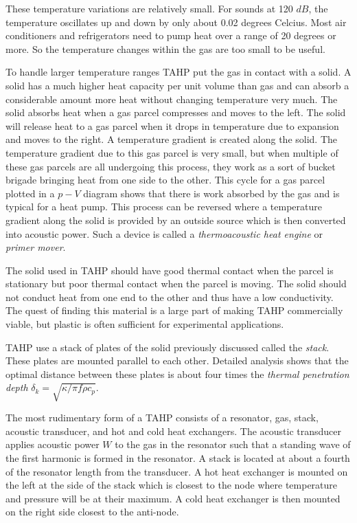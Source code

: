 \documentclass{article}
\begin{document}
These temperature variations are relatively small. For sounds at 120 \(dB\), the temperature oscillates up and down by only about 0.02 degrees Celcius. Most air conditioners and refrigerators need to pump heat over a range of 20 degrees or more. So the temperature changes within the gas are too small to be useful.

To handle larger temperature ranges TAHP put the gas in contact with a solid. A solid has a much higher heat capacity per unit volume than gas and can absorb a considerable amount more heat without changing temperature very much. The solid absorbs heat when a gas parcel compresses and moves to the left. The solid will release heat to a gas parcel when it drops in temperature due to expansion and moves to the right. A temperature gradient is created along the solid. The temperature gradient due to this gas parcel is very small, but when multiple of these gas parcels are all undergoing this process, they work as a sort of bucket brigade bringing heat from one side to the other. %
This cycle for a gas parcel plotted in a \(p-V\) diagram shows that there is work absorbed by the gas and is typical for a heat pump.  %
This process can be reversed where a temperature gradient along the solid is provided by an outside source which is then converted into acoustic power. Such a device is called a \emph{thermoacoustic heat engine} or \emph{primer mover}.

The solid used in TAHP should have good thermal contact when the parcel is stationary but poor thermal contact when the parcel is moving. The solid should not conduct heat from one end to the other and thus have a low conductivity. The quest of finding this material is a large part of making TAHP commercially viable, but plastic is often sufficient for experimental applications.

TAHP use a stack of plates of the solid previously discussed called the \emph{stack}. These plates are mounted parallel to each other. Detailed analysis shows that the optimal distance between these plates is about four times the \emph{thermal penetration depth} \(\delta_k = \sqrt{\kappa/\pi f \rho c_p}\). %

The most rudimentary form of a TAHP consists of a resonator, gas, stack, acoustic transducer, and hot and cold heat exchangers. The acoustic transducer applies acoustic power \(W\) to the gas in the resonator such that a standing wave of the first harmonic is formed in the resonator. A stack is located at about a fourth of the resonator length from the transducer. A hot heat exchanger is mounted on the left at the side of the stack which is closest to the node where temperature and pressure will be at their maximum. A cold heat exchanger is then mounted on the right side closest to the anti-node.
\end{document}
